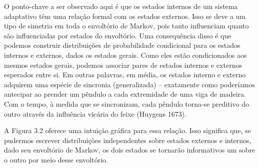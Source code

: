 \documentclass[
  12pt,
]{book}
\begin{document}
O ponto-chave a ser observado aqui é que os estados internos de um sistema adaptativo têm uma relação formal com os estados externos. Isso se deve a um tipo de simetria em toda o envoltório de Markov, pois tanto influenciam quanto são influenciadas por estados do envoltório. Uma consequência disso é que podemos construir distribuições de probabilidade condicional para os estados internos e externos, dados os estados gerais. Como eles estão condicionados aos mesmos estados gerais, podemos associar pares de estados internos e externos esperados entre si. Em outras palavras, em média, os estados interno e externo adquirem uma espécie de sincronia (generalizada) -- exatamente como poderíamos antecipar ao prender um pêndulo a cada extremidade de uma viga de madeira. Com o tempo, à medida que se sincronizam, cada pêndulo torna-se preditivo do outro através da influência vicária do feixe (Huygens 1673).

A Figura 3.2 oferece uma intuição gráfica para essa relação. Isso significa que, se pudermos escrever distribuições independentes sobre estados externos e internos, dado seu envoltório de Markov, os dois estados se tornarão informativos um sobre o outro por meio desse envoltório.
\end{document}
